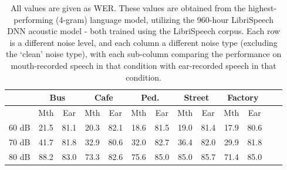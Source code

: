 \begin{table}[h]
\begin{center}
\begin{tabular}{| c || c | c | c | c | c | c | c | c | c | c | c | c |} \hline
      & \multicolumn{2}{|c|}{Bus} & \multicolumn{2}{|c|}{Cafe} & \multicolumn{2}{|c|}{Ped.} & \multicolumn{2}{|c|}{Street} & \multicolumn{2}{|c|}{Factory} \\ \hline
      & Mth & Ear & Mth & Ear & Mth & Ear & Mth & Ear & Mth & Ear \\ \hline\hline
60 dB & 21.5 & 81.1 & 20.3 & 82.1 & 18.6 & 81.5 & 19.0 & 81.4 & 17.9 & 80.6  \\ \hline
70 dB & 41.7 & 81.8 & 32.9 & 80.6 & 32.0 & 82.7 & 36.4 & 82.0 & 29.9 & 81.8  \\ \hline
80 dB & 88.2 & 83.0 & 73.3 & 82.6 & 75.6 & 85.0 & 85.0 & 85.7 & 71.4 & 85.0 \\ \hline
\end{tabular}
\end{center}
\caption{All values are given as WER. These values are obtained from the highest-performing (4-gram) language model, utilizing the 960-hour LibriSpeech DNN acoustic model - both trained using the LibriSpeech corpus.  Each row is a different noise level, and each column a different noise type (excluding the `clean' noise type), with each sub-column comparing the performance on mouth-recorded speech in that condition with ear-recorded speech in that condition.}\label{tab:split-wer-noise}
\end{table}
